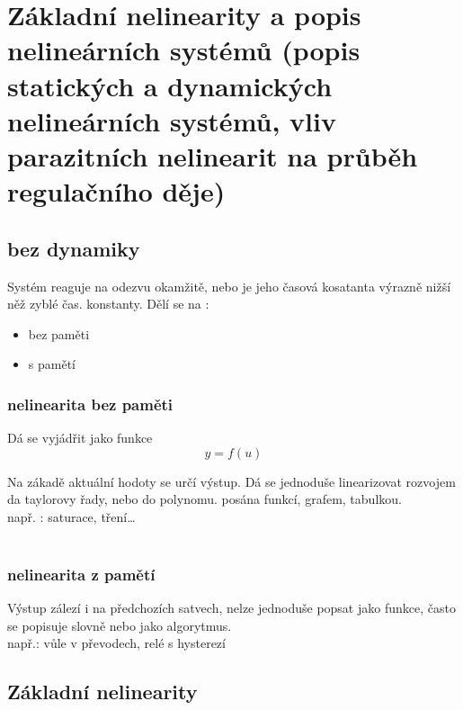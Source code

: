\section{Základní nelinearity a popis nelineárních systémů (popis statických a dynamických nelineárních systémů,
vliv parazitních nelinearit na průběh regulačního děje)}



\subsection{bez dynamiky}
Systém reaguje na odezvu okamžitě, nebo je jeho časová kosatanta výrazně nižší něž zyblé čas. konstanty.
Dělí se na :

\begin{itemize}
    \item bez paměti
    \item s pamětí
\end{itemize}

\subsubsection*{nelinearita bez paměti}

Dá se vyjádřit jako funkce 
\begin{equation}
    y=f(u)
\end{equation}

Na zákadě aktuální hodoty se určí výstup. Dá se jednoduše linearizovat rozvojem da taylorovy řady, nebo do polynomu.
posána funkcí, grafem, tabulkou.
\\
např. :  saturace, tření\dots
\\
\\
\subsubsection*{nelinearita z pamětí}
Výstup zálezí i na předchozích satvech, nelze jednoduše popsat jako funkce, často se popisuje slovně nebo jako algorytmus.
\\
např.: vůle v převodech, relé s hysterezí

\subsection*{Základní nelinearity}

